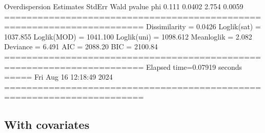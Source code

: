 \documentclass[letterpaper,10pt,english]{sphinxmanual}
\begin{document}
\begin{sphinxVerbatim}[commandchars=\\\{\}]
Overdispersion
     Estimates  StdErr    Wald  p\PYGZhy{}value
phi      0.111  0.0402   2.754   0.0059
=======================================================================
Dissimilarity = 0.0426
Loglik(sat)   = \PYGZhy{}1037.855
Loglik(MOD)   = \PYGZhy{}1041.100
Loglik(uni)   = \PYGZhy{}1098.612
Mean\PYGZhy{}loglik   = \PYGZhy{}2.082
Deviance      = 6.491
\PYGZhy{}\PYGZhy{}\PYGZhy{}\PYGZhy{}\PYGZhy{}\PYGZhy{}\PYGZhy{}\PYGZhy{}\PYGZhy{}\PYGZhy{}\PYGZhy{}\PYGZhy{}\PYGZhy{}\PYGZhy{}\PYGZhy{}\PYGZhy{}\PYGZhy{}\PYGZhy{}\PYGZhy{}\PYGZhy{}\PYGZhy{}\PYGZhy{}\PYGZhy{}\PYGZhy{}\PYGZhy{}\PYGZhy{}\PYGZhy{}\PYGZhy{}\PYGZhy{}\PYGZhy{}\PYGZhy{}\PYGZhy{}\PYGZhy{}\PYGZhy{}\PYGZhy{}\PYGZhy{}\PYGZhy{}\PYGZhy{}\PYGZhy{}\PYGZhy{}\PYGZhy{}\PYGZhy{}\PYGZhy{}\PYGZhy{}\PYGZhy{}\PYGZhy{}\PYGZhy{}\PYGZhy{}\PYGZhy{}\PYGZhy{}\PYGZhy{}\PYGZhy{}\PYGZhy{}\PYGZhy{}\PYGZhy{}\PYGZhy{}\PYGZhy{}\PYGZhy{}\PYGZhy{}\PYGZhy{}\PYGZhy{}\PYGZhy{}\PYGZhy{}\PYGZhy{}\PYGZhy{}\PYGZhy{}\PYGZhy{}\PYGZhy{}\PYGZhy{}\PYGZhy{}\PYGZhy{}
AIC = 2088.20
BIC = 2100.84
=======================================================================
Elapsed time=0.07919 seconds =====\PYGZgt{}\PYGZgt{}\PYGZgt{} Fri Aug 16 12:18:49 2024
=======================================================================
\end{sphinxVerbatim}

\noindent{}


\subsection{With covariates}
\label{\detokenize{manual:cube-with-covariates}}\label{\detokenize{manual:id34}}
\sphinxAtStartPar
{}
\end{document}
